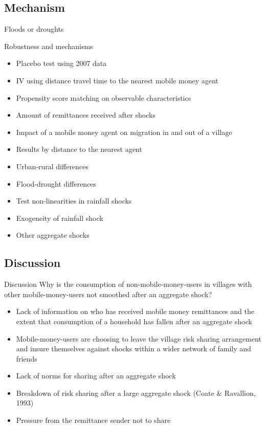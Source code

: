 \documentclass[t]{beamer}
\begin{document}
\subsection*{Mechanism}
\begin{frame}{Floods or droughts}
\vspace{-10pt}

\end{frame}
\begin{frame}{Robustness and mechanisms}
\begin{itemize}
\item Placebo test using 2007 data 
\item IV using distance travel time to the nearest mobile money agent
\item Propensity score matching on observable characteristics
\item Amount of remittances received after shocks
\item Impact of a mobile money agent on migration in and out of a village
\item Results by distance to the nearest agent
\item Urban-rural differences
\item Flood-drought differences
\item Test non-linearities in rainfall shocks
\item Exogeneity of rainfall shock
\item Other aggregate shocks
\end{itemize}
\end{frame}
\subsection*{Discussion}
\begin{frame}{Discussion}
Why is the consumption of non-mobile-money-users in villages with other mobile-money-users not smoothed after an aggregate shock? 
\begin{itemize}
\item Lack of information on who has received mobile money remittances and the extent that consumption of a household has fallen after an aggregate shock
\item Mobile-money-users are choosing to leave the village risk sharing arrangement and insure themselves against shocks within a wider network of family and friends 
\item Lack of norms for sharing after an aggregate shock
\item Breakdown of risk sharing after a large aggregate shock (Coate \& Ravallion, 1993)
\item Pressure from the remittance sender not to share
\end{itemize}
\end{frame}
\end{document}
